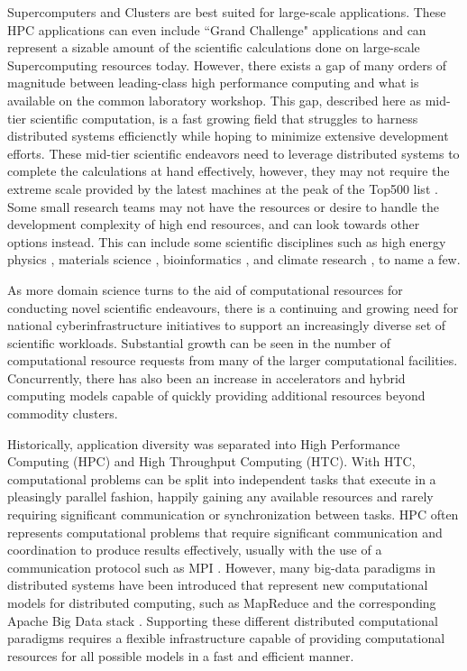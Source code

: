 Supercomputers and Clusters are best suited for large-scale applications.  These HPC applications can even include ``Grand Challenge" applications \cite{hoare2005grand} and can represent a sizable amount of the scientific calculations done on large-scale Supercomputing resources today. However, there exists a gap of many orders of magnitude  between leading-class high performance computing and what is available on the common laboratory workshop. This gap, described here as mid-tier scientific computation, is a fast growing field that struggles to harness distributed systems efficienctly while hoping to minimize extensive development efforts. These mid-tier scientific endeavors need to leverage distributed systems to complete the calculations at hand effectively, however, they may not require the extreme scale provided by the latest machines at the peak of the Top500 list \cite{www-top500}. Some small research teams may not have the resources or desire to handle the development complexity of high end resources, and can look towards other options instead.  This can include some scientific disciplines such as high energy physics \cite{buncic2010cernvm}, materials science \cite{wang2006survey}, bioinformatics \cite{menon2012cloud}, and climate research \cite{He2010nasa}, to name a few.  


As more domain science turns to the aid of computational resources for conducting novel scientific endeavours, there is a continuing and growing need for national cyberinfrastructure initiatives to support an increasingly diverse set of scientific workloads. Substantial growth can be seen in the number of computational resource requests \cite{towns2014xsede, antypas2008nersc} from many of the larger computational facilities.  Concurrently, there has also been an increase in accelerators and hybrid computing models capable of quickly providing additional resources \cite{vetter2011keeneland} beyond commodity clusters.

Historically, application diversity was separated into High Performance Computing (HPC) and High Throughput Computing (HTC).  With HTC, computational problems can be split into independent tasks that execute in a pleasingly parallel fashion, happily gaining any available resources and rarely requiring significant communication or synchronization between tasks. HPC often represents computational problems that require significant communication and coordination to produce results effectively,  usually with the use of a communication protocol such as MPI \cite{mpi}. However, many big-data paradigms \cite{agrawal2011big} in distributed systems  have been introduced that represent new computational models for distributed computing, such as MapReduce \cite{dean2008mapreduce} and the corresponding Apache Big Data stack \cite{kamburugamuve2013survey, chen2014big}. Supporting these different distributed computational paradigms requires a flexible infrastructure capable of providing computational resources for all possible models in a fast and efficient manner.



